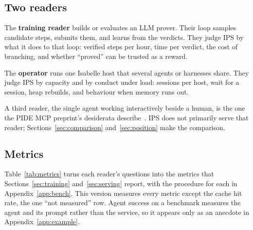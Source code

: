 \documentclass[11pt]{article}
\begin{document}
\subsection{Two readers}

The \textbf{training reader} builds or evaluates an LLM prover. Their
loop samples candidate steps, submits them, and learns from the verdicts.
They judge IPS by what it does to that loop: verified steps per hour,
time per verdict, the cost of branching, and whether ``proved'' can be
trusted as a reward.

The \textbf{operator} runs one Isabelle host that several agents or
harnesses share. They judge IPS by capacity and by conduct under load:
sessions per host, wait for a session, heap rebuilds, and behaviour when
memory runs out.

A third reader, the single agent working interactively beside a human, is
the one the PIDE MCP preprint's desiderata
describe~\cite{kappelmann2026pidemcp}. IPS does not primarily serve that
reader; Sections~\ref{sec:comparison} and~\ref{sec:position} make the
comparison.

\subsection{Metrics}

Table~\ref{tab:metrics} turns each reader's questions into the metrics
that Sections~\ref{sec:training} and~\ref{sec:serving} report, with the
procedure for each in Appendix~\ref{app:bench}. This version measures
every metric except the cache hit rate, the one ``not measured'' row.
Agent success on
a benchmark measures the agent and its prompt rather than the service, so
it appears only as an anecdote in Appendix~\ref{app:example}.
\end{document}
